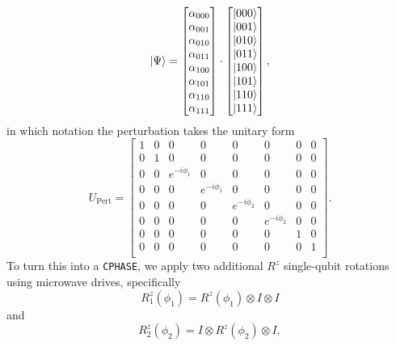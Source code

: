 \documentclass{report}
\begin{document}
\begin{appendices}
\begin{equation*}
\ket{\Psi} = 
    \begin{bmatrix}
    \alpha_{000} \\\alpha_{001} \\\alpha_{010} \\\alpha_{011} \\\alpha_{100} \\\alpha_{101} \\\alpha_{110} \\\alpha_{111} \\
    \end{bmatrix} \cdot
    \begin{bmatrix}
    \ket{000} \\\ket{001} \\\ket{010} \\\ket{011} \\\ket{100} \\\ket{101} \\\ket{110} \\\ket{111} \\
    \end{bmatrix},
\end{equation*}
in which notation the perturbation takes the unitary form
\begin{equation*}
    U_\mathrm{Pert} = 
    \begin{bmatrix}
        1 & 0 & 0 & 0 & 0 & 0 & 0 & 0\\
        0 & 1 & 0 & 0 & 0 & 0 & 0 & 0\\
        0 & 0 & e^{-i\phi_1} & 0 & 0 & 0 & 0 & 0\\
        0 & 0 & 0 & e^{-i\phi_1} & 0 & 0 & 0 & 0\\
        0 & 0 & 0 & 0 & e^{-i\phi_2} & 0 & 0 & 0\\
        0 & 0 & 0 & 0 & 0 & e^{-i\phi_2} & 0 & 0\\
        0 & 0 & 0 & 0 & 0 & 0 & 1 & 0\\
        0 & 0 & 0 & 0 & 0 & 0 & 0 & 1\\
    \end{bmatrix}.
\end{equation*}
To turn this into a \texttt{CPHASE}, we apply two additional $R^z$ single-qubit rotations using microwave drives, specifically
\begin{equation*}
    R^z_1(\phi_1) = R^z(\phi_1) \otimes I \otimes I
\end{equation*}
and
\begin{equation*}
    R^z_2(\phi_2) = I \otimes R^z(\phi_2) \otimes I,

\end{equation*}
\end{appendices}
\end{document}
